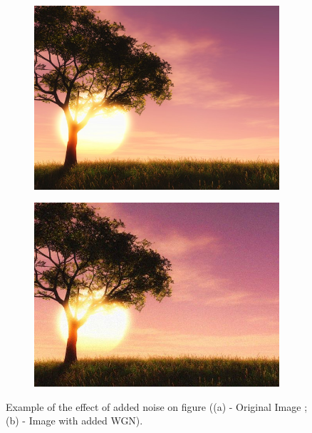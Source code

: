 \begin{figure}[h]
    \centering
    \begin{subfigure}[c]{\textwidth}
        \centering
        \includegraphics[width=\figwidth]{Sections/2AV1/Diagrams/paisagemOri.jpg}
        \caption{}
        \label{subfig:noiseOri}
    \end{subfigure}
    \begin{subfigure}[c]{\textwidth}
        \centering
        \includegraphics[width=\figwidth]{Sections/2AV1/Diagrams/paisagemNoise.jpg}
        \caption{}
        \label{subfig:noise}
    \end{subfigure}
    \caption[Example of the effect of added noise on figure]{Example of the effect of added noise on figure ((a) - Original Image \cite{Freepik}; (b) - Image with added WGN).}
    \label{fig:noise}
\end{figure}

